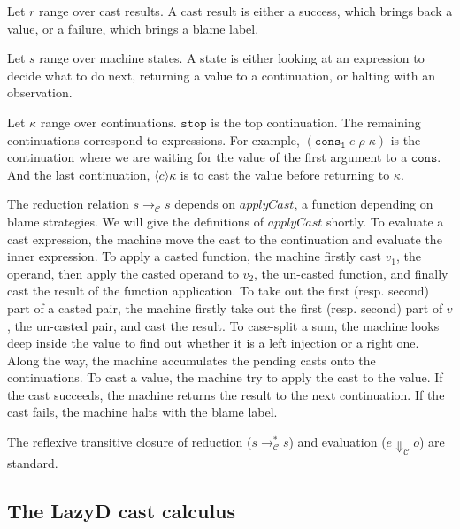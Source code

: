 \documentclass[acmsmall,review,anonymous]{acmart}\settopmatter{printfolios=true,printccs=false,printacmref=false}
\newcommand{\lazyD}{Lazy\;D}
\newcommand{\judgeCreduce}[2]{#1 \longrightarrow_{\mathcal{C}} #2}
\newcommand{\judgeCreduceTrans}[2]{#1 \longrightarrow_{\mathcal{C}}^{*} #2}
\newcommand{\judgeCeval}[2]{#1 \Downarrow_{\mathcal{C}} #2}
\begin{document}
Let $ r $ range over cast results. A cast result is either a success, which 
brings back a value, or a failure, which brings a blame label.

Let $ s $ range over machine states. A state is either looking at an 
expression to decide what to do next, returning a value to a continuation, or 
halting with an observation.

Let $ \kappa $ range over continuations. $ \mathtt{stop} $ is the top 
continuation. The remaining continuations correspond to expressions. For 
example, $ (\mathtt{cons_1} \; e \; \rho \; \kappa) $ is the continuation where 
we are waiting for the value of the first argument to a $ \mathtt{cons} $. And 
the last continuation, $ \langle c \rangle \kappa $ is to cast the value before 
returning to $ \kappa $.

The reduction relation $ \judgeCreduce{s}{s} $ depends on $ applyCast $, a 
function depending on blame strategies. We will give the definitions of $ 
applyCast $ shortly.
To evaluate a cast 
expression, the machine move the 
cast to the continuation and evaluate the inner expression. To apply a casted 
function, the machine firstly cast $ v_1 $, the operand, then apply the casted 
operand to $ v_2 $, the un-casted function, and finally cast the result of the 
function application. To take out the first (resp. second) part of a casted 
pair, the machine firstly take out the first (resp. second) part of $ v $, the 
un-casted pair, and cast the result. To case-split a sum, the machine looks 
deep inside the value to find out whether it is a left injection or a right 
one.
Along the way, the machine accumulates the pending casts onto the 
continuations. To cast a value, the machine try to apply the cast to the value. 
If the cast succeeds, the machine returns the result to the next continuation. 
If the cast fails, the machine halts with the blame label.

The reflexive transitive closure of reduction ($ \judgeCreduceTrans{s}{s} $) 
and evaluation ($ \judgeCeval{e}{o} $) are standard.

\subsection{The \lazyD{} cast calculus}
\end{document}

